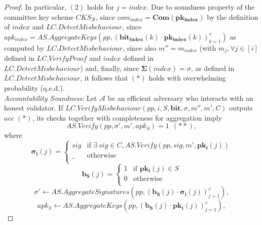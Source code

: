 \begin{proof}
\noindent In particular, $(2)$ holds for $j = \mathit{index}$. Due to soundness property of the committee key scheme $\mathit{CKS_{\mathcal{R}}}$, 
since $\mathit{com_{\mathit{index}}} = \mathbf{Com}(\mathbf{pk_{\mathbf{index}}})$ by the definition of $\mathit{index}$ and 
$\mathit{LC.DetectMisbehaviour}$, since $\mathit{apk_{\mathit{index}}} = \mathit{AS.AggregateKeys}(\mathit{pp}, 
(\mathbf{bit_{\mathbf{index}}}(k) \cdot \mathbf{pk_{\mathbf{index}}}(k))_{k=1}^v)$ as computed by $\mathit{LC.DetectMisbehaviour}$, 
since also $m'' = m_{\mathit{index}}$ (with $m_j, \forall j \in [i]$ defined in $\mathit{LC.VerifyProof}$ and $\mathit{index}$ defined 
in \\ $\mathit{LC.DetectMisbehaviour}$) and, finally, since $\mathbf{\Sigma}(\mathit{index}) = \sigma$, as defined in $\mathit{LC.DetectMisbehaviour}$, 
it follows that $(*)$ holds with overwhelming probability (q.e.d.). \\
 
\noindent \textit{Accountability Soundness:} Let $\mathcal{A}$ be an efficient adversary who interacts with an honest validator. If $\mathit{LC.VerifyMisbehaviour}(\mathit{pp}, i, S, \mathbf{bit}, \sigma, m'', m', C)$ 
outputs $\mathit{acc}$ $(\ast)$, its checks together with completeness for aggregation imply 
$$\mathit{AS.Verify}(\mathit{pp}, \sigma', m', \mathit{apk_S}) = 1 \ \ (\ast\ast),$$
where 
\begin{equation*}
  \mathbf{\sigma_i}(j) =
    \begin{cases}
      \mathit{sig} & \text{if }  \exists \ \mathit{sig} \in C, \mathit{AS.Verify}(\mathit{pp}, \mathit{sig}, m', \mathbf{pk_i}(j)) \\
      \_ & \text{otherwise} \\
    \end{cases}       
\end{equation*}
\begin{equation*}
  \mathbf{b_{S}}(j) =
    \begin{cases}
      1 & \text{if }  \mathbf{pk_i}(j) \in S \\
      0 & \text{otherwise} \\
    \end{cases}       
\end{equation*}
$$ \sigma' \leftarrow  \mathit{AS.AggregateSignatures}(\mathit{pp}, (\mathbf{b_{S}}(j) \cdot \mathbf{\sigma_i}(j))_{j=1}^v),$$
$$\mathit{apk_S} \leftarrow \mathit{AS.AggregateKeys}(\mathit{pp},(\mathbf{b_{S}}(j) \cdot \mathbf{pk_i}(j))_{j=1}^v),$$


\end{proof}
